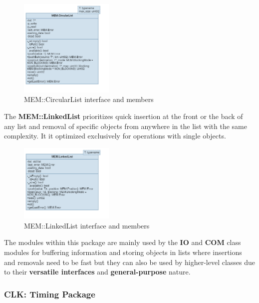 \begin{figure}[H]
	\centering
	\includegraphics[width=0.4\textwidth]{./img/navig-class-circularlist.png}
	\caption {MEM::CircularList interface and members}
	\label{fig:navig-class-circularlist}
	\end{figure}

The \textbf{MEM::LinkedList} prioritizes quick insertion at the front or the back of any list and removal of specific objects from anywhere in the list with the same complexity. It it optimized exclusively for operations with single objects.

\begin{figure}[H]
	\centering
	\includegraphics[width=0.4\textwidth]{./img/navig-class-linkedlist.png}
	\caption {MEM::LinkedList interface and members}
	\label{fig:navig-class-linkedlist}
	\end{figure}


The modules within this package are mainly used by the \textbf{IO} and \textbf{COM} class modules for buffering information and storing objects in lists where insertions and removals need to be fast but they can also be used by higher-level classes due to their \textbf{versatile interfaces} and \textbf{general-purpose} nature.



\subsubsection{CLK: Timing Package}

